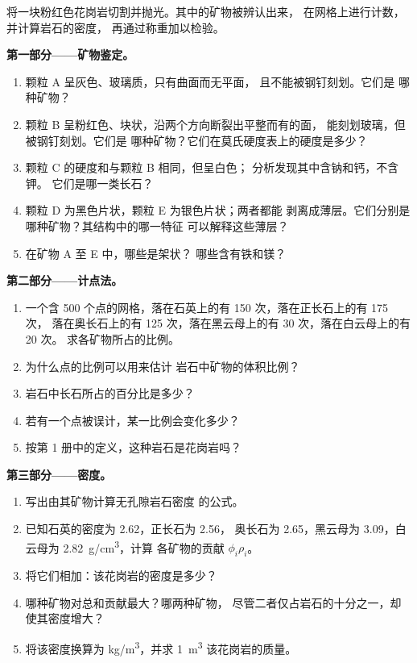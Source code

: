 \begin{problem}
\label{pb:g11:minerals:1}
将一块粉红色花岗岩切割并抛光。其中的矿物被辨认出来，
在网格上进行计数，并计算岩石的密度，
再通过称重加以检验。

\medskip
\noindent\textbf{第一部分——矿物鉴定。}
\begin{enumerate}
  \item 颗粒 A 呈灰色、玻璃质，只有曲面而无平面，
        且不能被钢钉刻划。它们是
        哪种矿物？
  \item 颗粒 B 呈粉红色、块状，沿两个方向断裂出平整而有的面，
        能刻划玻璃，但被钢钉刻划。它们是
        哪种矿物？它们在莫氏硬度表上的硬度是多少？
  \item 颗粒 C 的硬度和与颗粒 B 相同，但呈白色；
        分析发现其中含钠和钙，不含钾。
        它们是哪一类长石？
  \item 颗粒 D 为黑色片状，颗粒 E 为银色片状；两者都能
        剥离成薄层。它们分别是哪种矿物？其结构中的哪一特征
        可以解释这些薄层？
  \item 在矿物 A 至 E 中，哪些是架状？
        哪些含有铁和镁？
\end{enumerate}

\medskip
\noindent\textbf{第二部分——计点法。}
\begin{enumerate}[resume]
  \item 一个含 500 个点的网格，落在石英上的有 150 次，落在正长石上的有 175 次，
        落在奥长石上的有 125 次，落在黑云母上的有 30 次，落在白云母上的有 20 次。
        求各矿物所占的比例。
  \item 为什么点的比例可以用来估计
        岩石中矿物的体积比例？
  \item 岩石中长石所占的百分比是多少？
  \item 若有一个点被误计，某一比例会变化多少？
  \item 按第 1 册中的定义，这种岩石是花岗岩吗？
\end{enumerate}

\medskip
\noindent\textbf{第三部分——密度。}
\begin{enumerate}[resume]
  \item 写出由其矿物计算无孔隙岩石密度
        的公式。
  \item 已知石英的密度为 \qty{2.62}{}，正长石为 \qty{2.56}{}，
        奥长石为 \qty{2.65}{}，黑云母为 \qty{3.09}{}，白云母为
        \qty{2.82}{g/cm^3}，计算
        各矿物的贡献 $\phi_i \rho_i$。
  \item 将它们相加：该花岗岩的密度是多少？
  \item 哪种矿物对总和贡献最大？哪两种矿物，
        尽管二者仅占岩石的十分之一，却使其密度增大？
  \item 将该密度换算为 \unit{kg/m^3}，并求
        \qty{1}{m^3} 该花岗岩的质量。
\end{enumerate}


\end{problem}
